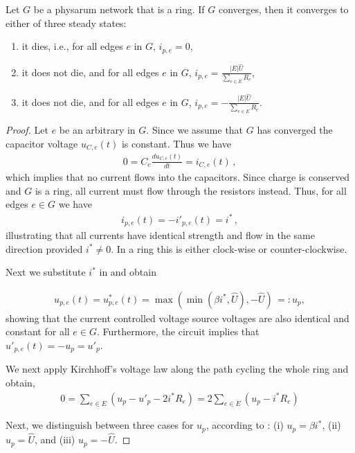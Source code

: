 \begin{lem}\label{lem:ring_cont}
Let $G$ be a physarum network that is a ring. If $G$ converges, then it converges to either of three steady states:
\begin{enumerate}
\item it dies, i.e., for all edges $e$ in $G$, $i_{p,e}=0$,
\item it does not die, and for all edges $e$ in $G$, $i_{p,e}=\frac{|E|\hat{U}}{\sum_{e \in E} R_e}$,
\item it does not die, and for all edges $e$ in $G$, $i_{p,e}=-\frac{|E|\hat{U}}{\sum_{e \in E} R_e}$.
\end{enumerate}
\end{lem}
\begin{proof}
Let $e$ be an arbitrary \Pe in $G$. Since we assume that $G$ has converged the capacitor voltage $u_{C,e}(t)$ is constant. Thus we have
\begin{align}
0 = C_e\frac{du_{C,e}(t)}{dt} = i_{C,e}(t)\,,
\end{align}
which implies that no current flows into the capacitors. Since charge is conserved and $G$ is a ring, all current must flow through the resistors instead. Thus, for all edges $e \in G$ we have
\begin{align}
  i_{p,e}(t) = - i'_{p,e}(t) = i^*\,,
\end{align}
illustrating that all currents have identical strength and flow in the same direction provided $i^* \neq 0$. In a ring this is either clock-wise or counter-clockwise. 

Next we substitute $i^*$ in  and obtain

\begin{align}
  u_{p,e}(t) = u^*_{p,e}(t) = \max(\min(\beta i^*,\hat{U}),-\hat{U})\, =: u_p,\label{eq:up}
\end{align}
showing that the current controlled voltage source voltages are also identical and constant for all $e \in G$.
Furthermore, the circuit implies that $u'_{p,e}(t) = - u_p = u'_p$.

We next apply Kirchhoff's voltage law along the path cycling the whole ring and obtain,
\begin{align}
0 = \sum_{e \in E} (u_p - u'_p - 2 i^* R_e) = 2\sum_{e \in E} (u_p - i^* R_e)\label{eq:sum1}
\end{align}

Next, we distinguish between three cases for $u_p$, according to : (i) $u_p = \beta i^*$, (ii) $u_p = \hat{U}$,
  and (iii) $u_p = -\hat{U}$.


\end{proof}

